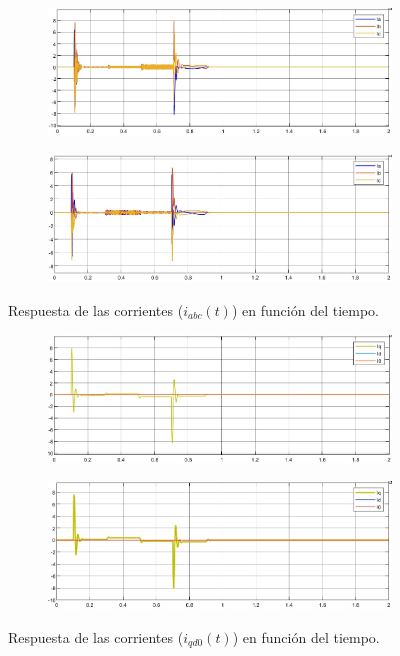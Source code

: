 \documentclass{article}
\begin{document}
\begin{figure}[H]
    \centering
    \begin{subfigure}[b]{0.8\textwidth}
        \includegraphics[width=\textwidth]{5.1.6_iabc.jpg}
    \end{subfigure}
    \begin{subfigure}[b]{0.8\textwidth}
        \includegraphics[width=1\textwidth]{5.1.6_iabc_NL.jpg}
    \end{subfigure}
    \caption{Respuesta de las corrientes ($i_{abc}(t)$) en función del tiempo.}
    \label{fig:iabc}
\end{figure}

\begin{figure}[H]
    \centering
    \begin{subfigure}[b]{0.8\textwidth}
        \includegraphics[width=\textwidth]{5.1.6_iqd0.jpg}
    \end{subfigure}
    \begin{subfigure}[b]{0.8\textwidth}
        \includegraphics[width=1\textwidth]{5.1.6_iqd0_NL.jpg}
    \end{subfigure}
    \caption{Respuesta de las corrientes ($i_{qd0}(t)$) en función del tiempo.}
    \label{fig:iqd0}
\end{figure}
\end{document}
